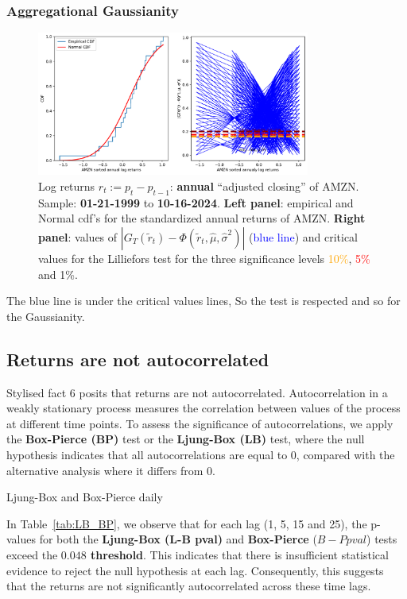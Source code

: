 \documentclass{article}
\begin{document}
\subsubsection{Aggregational Gaussianity}
\begin{figure}[H]
    \centering
    \includegraphics[width=0.8\textwidth]{Img/lillie_test_AMZNannualy.pdf}
    \caption{Log returns $r_t := p_t - p_{t-1}$: \textbf{annual} “adjusted closing” of AMZN. 
    Sample: \textbf{01-21-1999} to \textbf{10-16-2024}. \textbf{Left panel}: empirical and Normal cdf's for the standardized annual returns of AMZN. \textbf{Right panel}: values of $\left| G_T(\tilde{r}_t) - \Phi(\tilde{r}_t, \hat{\mu}, \hat{\sigma}^2) \right|$ (\textcolor{blue}{blue line}) and critical values for the Lilliefors test for the three significance levels \textcolor{orange}{10\%}, \textcolor{red}{5\%} and \textcolor{darkbrown}{1\%}.}
    \label{fig:Lillie_test_weekly}
\end{figure}

\noindent The blue line is under the critical values lines, 
So the test is respected and so for the Gaussianity.
\subsection{Returns are not autocorrelated}

Stylised fact 6 posits that returns are not autocorrelated. 
Autocorrelation in a weakly stationary process measures the correlation between values of the process at different time points. 
To assess the significance of autocorrelations, we apply the \textbf{Box-Pierce (BP)} test or the \textbf{Ljung-Box (LB)} test, 
where the null hypothesis indicates that all autocorrelations are equal to 0, compared with the alternative analysis where it differs from 0.

\begin{table}[H]

    \centering
      
    \caption{Ljung-Box and Box-Pierce daily}
    \label{tab:LB_BP}
\end{table}
In Table~\ref{tab:LB_BP}, we observe that for each lag (1, 5, 15 and 25), the p-values for both the \textbf{Ljung-Box (L-B pval)} and \textbf{Box-Pierce} ($B-P pval$) tests exceed the \textbf{$0.048$ threshold}. This indicates that there is insufficient statistical evidence to reject the null hypothesis at each lag. Consequently, this suggests that the returns are not significantly autocorrelated across these time lags.
\end{document}
